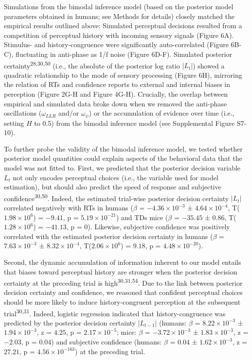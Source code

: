 \documentclass[
]{article}
\begin{document}
Simulations from the bimodal inference model (based on the posterior
model parameters obtained in humans; see Methods for details) closely
matched the empirical results outlined above: Simulated perceptual
decisions resulted from a competition of perceptual history with
incoming sensory signals (Figure 6A). Stimulus- and history-congruence
were significantly auto-correlated (Figure 6B-C), fluctuating in
anti-phase as 1/f noise (Figure 6D-F). Simulated posterior
certainty\textsuperscript{28,30,50} (i.e., the absolute of the posterior
log ratio \(|L_t|\)) showed a quadratic relationship to the mode of
sensory processing (Figure 6H), mirroring the relation of RTs and
confidence reports to external and internal biases in perception (Figure
2G-H and Figure 4G-H). Crucially, the overlap between empirical and
simulated data broke down when we removed the anti-phase oscillations
(\(\omega_{LLR}\) and/or \(\omega_{\psi}\)) or the accumulation of
evidence over time (i.e., setting \(H\) to 0.5) from the bimodal
inference model (see Supplemental Figure S7-10).

To further probe the validity of the bimodal inference model, we tested
whether posterior model quantities could explain aspects of the
behavioral data that the model was not fitted to. First, we predicted
that the posterior decision variable \(L_t\) not only encodes perceptual
choices (i.e., the variable used for model estimation), but should also
predict the speed of response and subjective
confidence\textsuperscript{30,50}. Indeed, the estimated trial-wise
posterior decision certainty \(|L_t|\) correlated negatively with RTs in
humans (\(\beta\) = \(\ensuremath{-4.36\times 10^{-3}}\) ±
\(\ensuremath{4.64\times 10^{-4}}\),
T(\(\ensuremath{1.98\times 10^{6}}\)) = \(-9.41\), p =
\(\ensuremath{5.19\times 10^{-21}}\)) and TDs mice (\(\beta\) =
\(-35.45\) ± \(0.86\), T(\(\ensuremath{1.28\times 10^{6}}\)) =
\(-41.13\), p = \(0\)). Likewise, subjective confidence was positively
correlated with the estimated posterior decision certainty in humans
(\(\beta\) = \(\ensuremath{7.63\times 10^{-3}}\) ±
\(\ensuremath{8.32\times 10^{-4}}\),
T(\(\ensuremath{2.06\times 10^{6}}\)) = \(9.18\), p =
\(\ensuremath{4.48\times 10^{-20}}\)).

Second, the dynamic accumulation of information inherent to our model
entails that biases toward perceptual history are stronger when the
posterior decision certainty at the preceding trial is
high\textsuperscript{30,31,54}. Due to the link between posterior
decision certainty and confidence, we reasoned that confident perceptual
choices should be more likely to induce history-congruent perception at
the subsequent trial\textsuperscript{30,31}. Indeed, logistic regression
indicated that history-congruence was predicted by the posterior
decision certainty \(|L_{t-1}|\) (humans: \(\beta\) =
\(\ensuremath{8.22\times 10^{-3}}\) ±
\(\ensuremath{1.94\times 10^{-3}}\), z = \(4.25\), p =
\(\ensuremath{2.17\times 10^{-5}}\); mice: \(\beta\) =
\(\ensuremath{-3.72\times 10^{-3}}\) ±
\(\ensuremath{1.83\times 10^{-3}}\), z = \(-2.03\), p = \(0.04\)) and
subjective confidence (humans: \(\beta\) = \(0.04\) ±
\(\ensuremath{1.62\times 10^{-3}}\), z = \(27.21\), p =
\(\ensuremath{4.56\times 10^{-163}}\)) at the preceding trial.
\end{document}

